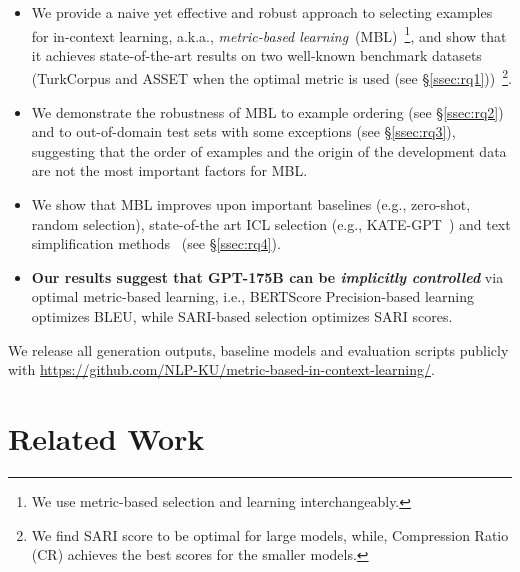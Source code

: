 \documentclass[11pt]{article}
\begin{document}
\begin{itemize}
  \item We provide a naive yet effective and robust approach to selecting examples for in-context learning, a.k.a., \textit{metric-based learning}~(MBL)~\footnote{We use metric-based selection and learning interchangeably.}, and show that it achieves state-of-the-art results on two well-known benchmark datasets (TurkCorpus and ASSET when the optimal metric is used (see \S\ref{ssec:rq1}))~\footnote{We find SARI score to be optimal for large models, while, Compression Ratio (CR) achieves the best scores for the smaller models.}.

   \item We demonstrate the robustness of MBL to example ordering (see \S\ref{ssec:rq2}) and to out-of-domain test sets with some exceptions (see \S\ref{ssec:rq3}), suggesting that the order of examples and the origin of the development data are not the most important factors for MBL. 
    
    \item We show that MBL improves upon important baselines (e.g., zero-shot, random selection), state-of-the art ICL selection (e.g., KATE-GPT~\cite{kategpt}) and text simplification methods~\citep{sheang-saggion-2021-controllable} (see \S\ref{ssec:rq4}).
  
    \item \textbf{Our results suggest that GPT-175B can be \textit{implicitly controlled}} via optimal metric-based learning, i.e., BERTScore Precision-based learning optimizes BLEU, while SARI-based selection optimizes SARI scores.
    
\end{itemize}
We release all generation outputs, baseline models and evaluation scripts publicly with \url{https://github.com/NLP-KU/metric-based-in-context-learning/}.
%
 

\section{Related Work}
\label{sec:rel_work}
\end{document}
